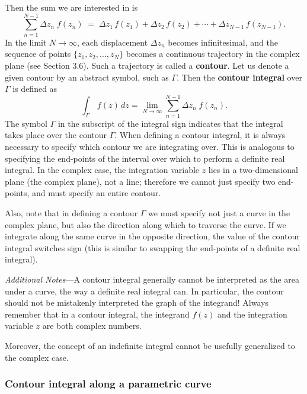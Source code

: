 \documentclass[10pt,a4paper]{article}
\begin{document}
\noindent
Then the sum we are interested in is
\begin{equation}
\sum_{n=1}^{N-1} \Delta z_n\; f(z_n) \;=\; \Delta z_1\, f(z_1) + \Delta z_2\, f(z_2) + \cdots + \Delta z_{N-1}\, f(z_{N-1}).
\end{equation}
In the limit $N \rightarrow \infty$, each displacement $\Delta z_{n}$
becomes infinitesimal, and the sequence of points $\{z_1, z_2, \dots,
z_N\}$ becomes a continuous trajectory in the complex plane (see
Section 3.6). Such a trajectory is called a \textbf{contour}. Let us
denote a given contour by an abstract symbol, such as $\Gamma$.  Then
the \textbf{contour integral} over $\Gamma$ is defined as
\begin{equation}
\int_\Gamma \, f(z)\, dz = \lim_{N \rightarrow \infty} \sum_{n=1}^{N-1} \Delta z_n\; f(z_n).
\end{equation}
The symbol $\Gamma$ in the subscript of the integral sign indicates
that the integral takes place over the contour $\Gamma$. When defining
a contour integral, it is always necessary to specify which contour we
are integrating over. This is analogous to specifying the end-points
of the interval over which to perform a definite real integral. In the
complex case, the integration variable $z$ lies in a two-dimensional
plane (the complex plane), not a line; therefore we cannot just
specify two end-points, and must specify an entire contour.

Also, note that in defining a contour $\Gamma$ we must specify not
just a curve in the complex plane, but also the direction along which to
traverse the curve. If we integrate along the same curve in the opposite
direction, the value of the contour integral switches sign (this is
similar to swapping the end-points of a definite real integral).

\vskip 0.1in
\begin{framed}\noindent
  \textit{Additional Notes}---A contour integral generally cannot be
  interpreted as the area under a curve, the way a definite real
  integral can. In particular, the contour should not be mistakenly
  interpreted the graph of the integrand! Always remember that in a
  contour integral, the integrand $f(z)$ and the integration variable
  $z$ are both complex numbers.

  \vskip 0.05in
  Moreover, the concept of an indefinite integral cannot be usefully
  generalized to the complex case.
\end{framed}
\vskip 0.15in

\subsubsection{Contour integral along a parametric curve}
\label{contour-integral-along-a-parametric-curve}
\end{document}
